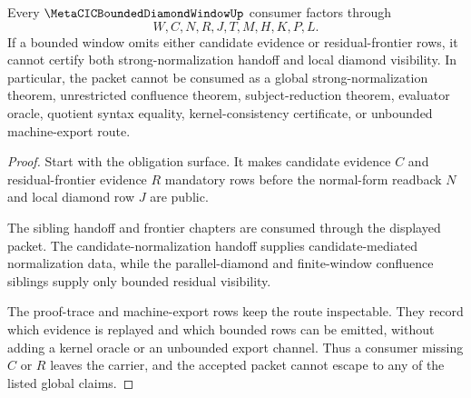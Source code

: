 \begin{theorem}
\label{thm:metacic-bounded-diamond-window-nonescape}
Every $\MetaCICBoundedDiamondWindowUp$ consumer factors through
$$
W,C,N,R,J,T,M,H,K,P,L.
$$
If a bounded window omits either candidate evidence or residual-frontier rows, it cannot certify both strong-normalization handoff and local diamond visibility. In particular, the packet cannot be consumed as a global strong-normalization theorem, unrestricted confluence theorem, subject-reduction theorem, evaluator oracle, quotient syntax equality, kernel-consistency certificate, or unbounded machine-export route.
\end{theorem}
\begin{proof}
Start with the obligation surface. It makes candidate evidence $C$ and residual-frontier evidence $R$ mandatory rows before the normal-form readback $N$ and local diamond row $J$ are public.

The sibling handoff and frontier chapters are consumed through the displayed packet. The candidate-normalization handoff supplies candidate-mediated normalization data, while the parallel-diamond and finite-window confluence siblings supply only bounded residual visibility.

The proof-trace and machine-export rows keep the route inspectable. They record which evidence is replayed and which bounded rows can be emitted, without adding a kernel oracle or an unbounded export channel. Thus a consumer missing $C$ or $R$ leaves the carrier, and the accepted packet cannot escape to any of the listed global claims.
\end{proof}



